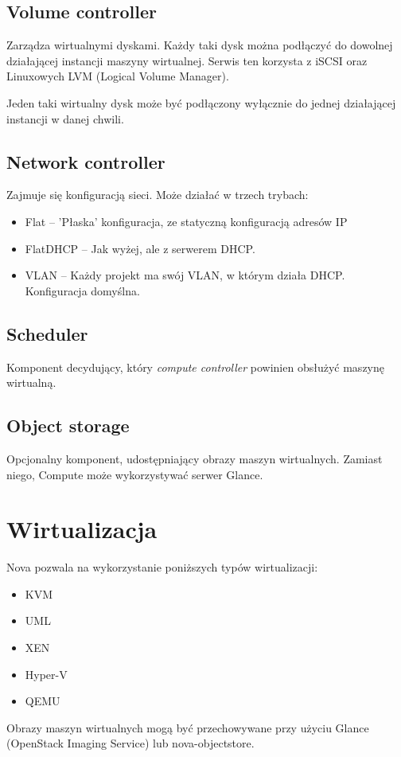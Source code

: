 \documentclass[a4paper,10pt]{article}
\begin{document}
\subsection{Volume controller}
Zarządza wirtualnymi dyskami. Każdy taki dysk można podłączyć do dowolnej działającej instancji maszyny wirtualnej. Serwis ten korzysta z iSCSI oraz Linuxowych LVM (Logical Volume Manager).

Jeden taki wirtualny dysk może być podłączony wyłącznie do jednej działającej instancji w danej chwili.

\subsection{Network controller}
Zajmuje się konfiguracją sieci. Może działać w trzech trybach:
\begin{itemize}
\item Flat -- 'Płaska' konfiguracja, ze statyczną konfiguracją adresów IP
\item FlatDHCP -- Jak wyżej, ale z serwerem DHCP.
\item VLAN -- Każdy projekt ma swój VLAN, w którym działa DHCP. Konfiguracja domyślna.
\end{itemize}

\subsection{Scheduler}
Komponent decydujący, który {\it compute controller} powinien obsłużyć maszynę wirtualną.

\subsection{Object storage}
Opcjonalny komponent, udostępniający obrazy maszyn wirtualnych. Zamiast niego, Compute może wykorzystywać serwer Glance.

\section{Wirtualizacja}

Nova pozwala na wykorzystanie poniższych typów wirtualizacji\cite{nova_manual}:

\begin{itemize}
\item{KVM}
\item{UML}
\item{XEN}
\item{Hyper-V}
\item{QEMU}
\end{itemize}

Obrazy maszyn wirtualnych mogą być przechowywane przy użyciu Glance (OpenStack Imaging Service) lub nova-objectstore.



	
\end{document}
